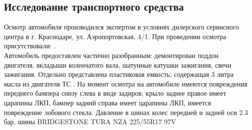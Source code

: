 \subsection{Исследование транспортного средства}
%
Осмотр автомобиля производился экспертом в условиях дилерского сервисного центра в г. Краснодаре, ул. Аэропортовская, 4/1. При проведении осмотра присутствовали: . \\
Автомобиль предоставлен частично разобранным: демонтирован поддон двигателя, вкладыши коленчатого вала, шатунные катушки зажигания, свечи зажигания.  Отдельно представлена пластиковая емкость, содержащая 3 литра масла из двигателя ТС .
На момент осмотра на автомобиле имеются повреждения переднего бампера снизу слева в виде задиров, крыло заднее правое  имеет царапины ЛКП, бампер задний справа имеет царапины ЛКП, имеется повреждение лобового стекла. Давление в шинах колес передней и задней оси 2.3 бар, шины BRIDGESTONE TURA NZA 225/55R17 97V
%
%
%
